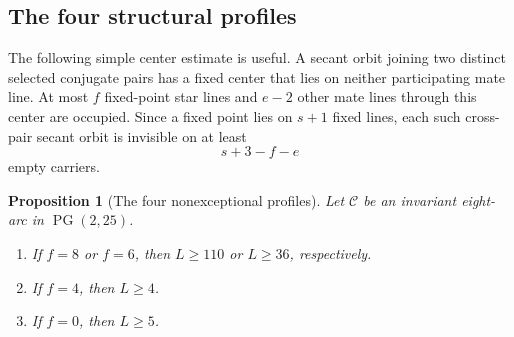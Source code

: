 \documentclass[11pt]{article}
\newtheorem{proposition}[theorem]{Proposition}
\theoremstyle{definition}
\theoremstyle{remark}
\newcommand{\PG}{\operatorname{PG}}
\newcommand{\cC}{\mathcal{C}}
\begin{document}
\subsection*{The four structural profiles}

The following simple center estimate is useful.  A secant orbit joining
two distinct selected conjugate pairs has a fixed center that lies on
neither participating mate line.  At most $f$ fixed-point star lines and
$e-2$ other mate lines through this center are occupied.  Since a fixed
point lies on $s+1$ fixed lines, each such cross-pair secant orbit is
invisible on at least
\begin{equation}\label{eq:cross-invisible}
  s+3-f-e
\end{equation}
empty carriers.

\begin{proposition}[The four nonexceptional profiles]
\label{prop:four-profiles}
Let $\cC$ be an invariant eight-arc in $\PG(2,25)$.
\begin{enumerate}[label=(\alph*),leftmargin=2em]
\item If $f=8$ or $f=6$, then $L\ge110$ or $L\ge36$, respectively.
\item If $f=4$, then $L\ge4$.
\item If $f=0$, then $L\ge5$.
\end{enumerate}
\end{proposition}
\end{document}
